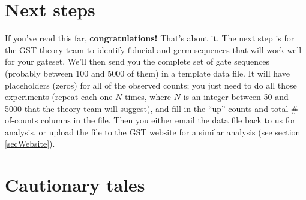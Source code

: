 \documentclass{article}[11pt]
\begin{document}
\section{Next steps\label{secNextSteps}}

If you've read this far, \textbf{congratulations!}  That's about it.  The next step is for the GST theory team to identify fiducial and germ sequences that will work well for your gateset.  We'll then send you the complete set of gate sequences (probably between 100 and 5000 of them) in a template data file.  It will have placeholders (zeros) for all of the observed counts; you just need to do all those experiments (repeat each one $N$ times, where $N$ is an integer between 50 and 5000 that the theory team will suggest), and fill in the ``up'' counts and total \#-of-counts columns in the file.  Then you either email the data file back to us for analysis, or upload the file to the GST website for a similar analysis (see section \ref{secWebsite}).


\section{Cautionary tales}
\end{document}
